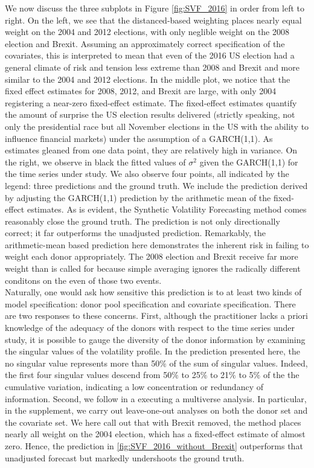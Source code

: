 \documentclass[11pt]{article}
\theoremstyle{definition}
\begin{document}
We now discuss the three subplots in Figure \ref{fig:SVF_2016} in order from left to right.  On the left, we see that the distanced-based weighting places nearly equal weight on the 2004 and 2012 elections, with only neglible weight on the 2008 election and Brexit.  Assuming an approximately correct specification of the covariates, this is interpreted to mean that even of the 2016 US election had a general climate of risk and tension less extreme than 2008 and Brexit and more similar to the 2004 and 2012 elections.  In the middle plot, we notice that the fixed effect estimates for 2008, 2012, and Brexit are large, with only 2004 registering a near-zero fixed-effect estimate.  The fixed-effect estimates quantify the amount of surprise the US election results delivered (strictly speaking, not only the presidential race but all November elections in the US with the ability to influence financial markets) under the assumption of a GARCH(1,1).  As estimates gleaned from one data point, they are relatively high in variance.  On the right, we observe in black the fitted values of $\sigma^{2}$ given the GARCH(1,1) for the time series under study.  We also observe four points, all indicated by the legend: three predictions and the ground truth.  We include the prediction derived by adjusting the GARCH(1,1) prediction by the arithmetic mean of the fixed-effect estimates.  As is evident, the Synthetic Volatility Forecasting method comes reasonably close the ground truth.  The prediction is not only directionally correct; it far outperforms the unadjusted prediction.  Remarkably, the arithmetic-mean based prediction here demonstrates the inherent risk in failing to weight each donor appropriately.  The 2008 election and Brexit receive far more weight than is called for because simple averaging ignores the radically different conditons on the even of those two events. \\

Naturally, one would ask how sensitive this prediction is to at least two kinds of model specification: donor pool specification and covariate specification.  There are two responses to these concerns.  First, although the practitioner lacks a priori knowledge of the adequacy of the donors with respect to the time series under study, it is possible to gauge the diversity of the donor information by examining the singular values of the volatility profile.  In the prediction presented here, the no singular value represents more than 50$\%$ of the sum of singular values.  Indeed, the first four singular values descend from 50$\%$ to 25$\%$ to 21$\%$ to 5$\%$ of the the cumulative variation, indicating a low concentration or redundancy of information.  Second, we follow \citet{steegen2016increasing} in a executing a multiverse analysis.  In particular, in the supplement, we carry out leave-one-out analyses on both the donor set and the covariate set.  We here call out that with Brexit removed, the method places nearly all weight on the 2004 election, which has a fixed-effect estimate of almost zero.  Hence, the prediction in \ref{fig:SVF_2016_without_Brexit} outperforms that unadjusted forecast but markedly undershoots the ground truth.
\end{document}
